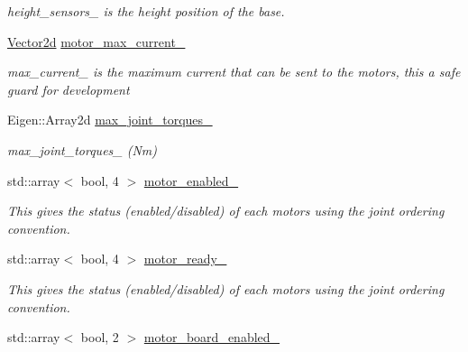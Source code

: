 \begin{DoxyCompactItemize}
\begin{DoxyCompactList}\small\item\em height\+\_\+sensors\+\_\+ is the height position of the base. \end{DoxyCompactList}\item 
\hyperlink{common__header_8hpp_acb6916bc8c9fe9d98c484fd4cc201447}{Vector2d} \hyperlink{classblmc__robots_1_1Teststand_aae2cff55630f887e4ed10af78b7dd0c1}{motor\+\_\+max\+\_\+current\+\_\+}\hypertarget{classblmc__robots_1_1Teststand_aae2cff55630f887e4ed10af78b7dd0c1}{}\label{classblmc__robots_1_1Teststand_aae2cff55630f887e4ed10af78b7dd0c1}

\begin{DoxyCompactList}\small\item\em max\+\_\+current\+\_\+ is the maximum current that can be sent to the motors, this a safe guard for development \end{DoxyCompactList}\item 
Eigen\+::\+Array2d \hyperlink{classblmc__robots_1_1Teststand_acf65e7889b3c8b3cbfa8b9e82e984b22}{max\+\_\+joint\+\_\+torques\+\_\+}\hypertarget{classblmc__robots_1_1Teststand_acf65e7889b3c8b3cbfa8b9e82e984b22}{}\label{classblmc__robots_1_1Teststand_acf65e7889b3c8b3cbfa8b9e82e984b22}

\begin{DoxyCompactList}\small\item\em max\+\_\+joint\+\_\+torques\+\_\+ (Nm) \end{DoxyCompactList}\item 
std\+::array$<$ bool, 4 $>$ \hyperlink{classblmc__robots_1_1Teststand_aedd9aae28f47062870e3afcb9474822b}{motor\+\_\+enabled\+\_\+}\hypertarget{classblmc__robots_1_1Teststand_aedd9aae28f47062870e3afcb9474822b}{}\label{classblmc__robots_1_1Teststand_aedd9aae28f47062870e3afcb9474822b}

\begin{DoxyCompactList}\small\item\em This gives the status (enabled/disabled) of each motors using the joint ordering convention. \end{DoxyCompactList}\item 
std\+::array$<$ bool, 4 $>$ \hyperlink{classblmc__robots_1_1Teststand_a62df6b43c18e44f62114b6f4d34ba8f4}{motor\+\_\+ready\+\_\+}\hypertarget{classblmc__robots_1_1Teststand_a62df6b43c18e44f62114b6f4d34ba8f4}{}\label{classblmc__robots_1_1Teststand_a62df6b43c18e44f62114b6f4d34ba8f4}

\begin{DoxyCompactList}\small\item\em This gives the status (enabled/disabled) of each motors using the joint ordering convention. \end{DoxyCompactList}\item 
std\+::array$<$ bool, 2 $>$ \hyperlink{classblmc__robots_1_1Teststand_a1fca1e72202c09982c2e77c3166d1ea7}{motor\+\_\+board\+\_\+enabled\+\_\+}\hypertarget{classblmc__robots_1_1Teststand_a1fca1e72202c09982c2e77c3166d1ea7}{}\label{classblmc__robots_1_1Teststand_a1fca1e72202c09982c2e77c3166d1ea7}


\end{DoxyCompactItemize}
